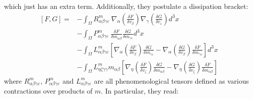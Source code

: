 \documentclass[reqno]{article}
\begin{document}
  which just has an extra term.
  Additionally, they postulate a dissipation bracket:
  \begin{equation} \label{eq:dissipative-bracket}
    \begin{split}
      \left[ F, G \right]
      =
      &- \int_\Omega R^m_{\alpha\beta\gamma\varepsilon} \: \nabla_\alpha \left( \frac{\delta F}{\delta v_\beta} \right)
      \nabla_\gamma \left( \frac{\delta G}{\delta v_\varepsilon} \right) d^3 x \\
      &- \int_\Omega P^m_{\alpha\beta\gamma\varepsilon} \: \frac{\delta F}{\delta m_{\alpha\beta}} \frac{\delta G}{\delta m_{\gamma \varepsilon}} d^3 x \\
      &- \int_\Omega L^m_{\alpha\beta\gamma\varepsilon} \left[ \nabla_\alpha \left( \frac{\delta F}{\delta v_\beta}\right) \frac{\delta G}{\delta m_{\gamma \varepsilon}}
        -  \nabla_\alpha \left( \frac{\delta G}{\delta v_\beta}\right) \frac{\delta F}{\delta m_{\gamma \varepsilon}}
      \right] d^3 x \\
      &- \int_\Omega L^m_{\eta \zeta \gamma\gamma} m_{\alpha\beta} \left[
        \nabla_\eta \left( \frac{\delta F}{\delta v_\zeta} \right) \frac{\delta G}{\delta m_{\alpha\beta}}
        - \nabla_\eta \left( \frac{\delta G}{\delta v_\zeta} \right) \frac{\delta F}{\delta m_{\alpha\beta}}
      \right]
    \end{split}
  \end{equation}
  where $R^m_{\alpha\beta\gamma\varepsilon}$,
  $P^m_{\alpha\beta\gamma\varepsilon}$ and $L^m_{\alpha\beta\gamma\varepsilon}$
  are all phenomenological tensors defined as various contractions over products
  of $m$.
  In particular, they read:
\end{document}
